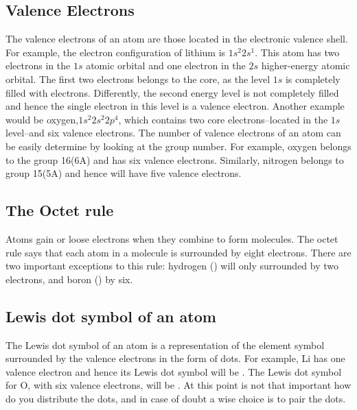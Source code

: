 \documentclass[cover.tex]{subfiles}
\begin{document}
\begin{refsection}
\subsection*{Valence Electrons}
The valence electrons of an atom are those located in the electronic valence shell. For example, the electron configuration of lithium is $1s^2 2s^1$. This atom has two electrons in the $1s$ atomic orbital and one electron in the $2s$ higher-energy atomic orbital. The first two electrons belongs to the core, as the level $1s$ is completely filled with electrons. Differently, the second energy level is not completely filled and hence the single electron in this level is a valence electron. Another example would be oxygen,$1s^2 2s^2 2p^4$, which contains two core electrons--located in the $1s$ level--and six valence electrons. The number of valence electrons of an atom can be easily determine by looking at the group number. For example, oxygen belongs to the group 16(6A) and has six valence electrons. Similarly, nitrogen belongs to group 15(5A) and hence will have five valence electrons.
\subsection*{The Octet rule} Atoms gain or loose electrons when they combine to form molecules. The octet rule says that each atom in a molecule is surrounded by eight electrons. There are two important exceptions to this rule: hydrogen () will only surrounded by two electrons, and boron () by six.
\subsection*{Lewis dot symbol of an atom}
The Lewis dot symbol of an atom is a representation of the element symbol surrounded by the valence electrons in the form of dots. For example, Li has one valence electron and hence its Lewis dot symbol will be \hspace{0.1cm}\hspace{0.1cm}. The Lewis dot symbol for O, with six valence electrons, will be \hspace{0.1cm}\hspace{0.1cm}. At this point is not that important how do you distribute the dots, and in case of doubt a wise choice is to pair the dots.


\end{refsection}
\end{document}
